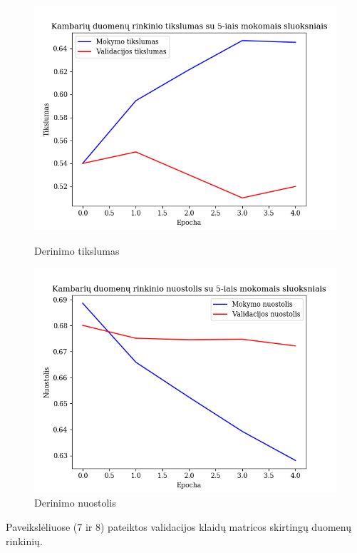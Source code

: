 \documentclass{VUMIFPSbakalaurinis}
\begin{document}
\begin{figure}[!htbp]
    \centering
    \begin{minipage}[b]{0.49\textwidth}
      \includegraphics[width=\textwidth]{img/small/5/Acc_smal_Room_5.png}
      \caption{Derinimo tikslumas}
    \end{minipage}
    \begin{minipage}[b]{0.49\textwidth}
      \includegraphics[width=\textwidth]{img/small/5/Loss_smal_Room_5.png}
      \caption{Derinimo nuostolis}
    \end{minipage}
\end{figure}

Paveikslėliuose (7 ir 8) pateiktos validacijos klaidų matricos skirtingų duomenų rinkinių. 
\end{document}
